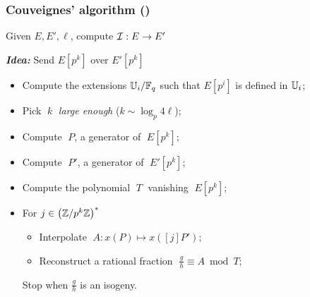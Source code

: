 \documentclass[10pt,usepdftitle=false]{beamer}
\begin{document}

\begin{frame}
  \frametitle{Couveignes' algorithm (\cite{couveignes96})}
  
  \begin{center}
    \large
    Given $E, E', \ell$, compute $\mathcal{I}:E\to E'$
  \end{center}

  \begin{center}
    \emph{\textbf{Idea:}} Send $E[p^k]$ over $E'[p^k]$
  \end{center}
  
  \begin{itemize}
  \item \alert<4>{Compute the extensions $\mathbb{U}_i/\mathbb{F}_q$
    such that $E[p^i]$ is defined in $\mathbb{U}_i$;}
    \hfill\emph{}
  \item Pick $\;k\;$ \emph{large enough} ($k\sim\log_p4\ell$);
  \item \alert<4>{Compute $\;P$, a generator of $\;E[p^k]$;}
    \hfill\emph{}
  \item \alert<4>{Compute $\;P'$, a generator of $\;E'[p^k]$;}
    \hfill\emph{}
  \item Compute the polynomial $\;T\;$ vanishing $\;E[p^k]$;
    \hfill\emph{}
  \item For $j\in\left(\mathbb{Z}/p^k\mathbb{Z}\right)^\ast$
    \begin{itemize}
      \normalsize
    \item Interpolate $\;A : x(P) \mapsto x([j]P')$;
      \hfill\emph{}
    \item Reconstruct a rational fraction  $\;\frac{g}{h}\equiv A \bmod T$;
      \hfill\emph{}
    \end{itemize}
    Stop when $\frac{g}{h}$ is an isogeny.
    \hfill\emph{}
  \end{itemize}
\end{frame}

\end{document}
